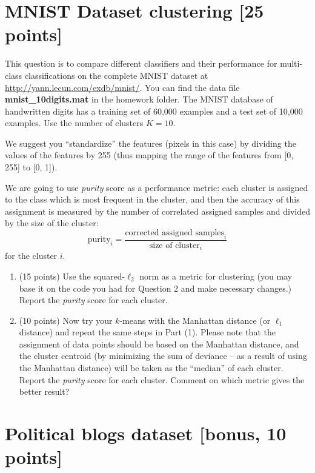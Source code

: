 \documentclass[twoside,10pt]{article}
\begin{document}
\section{MNIST Dataset clustering [25 points]}


This question is to compare different classifiers and their performance for multi-class classifications on the complete MNIST dataset at \url{http://yann.lecun.com/exdb/mnist/}. You can find the data file \textbf{mnist\_10digits.mat} in the homework folder. The MNIST database of handwritten digits has a training set of 60,000 examples and a test set of 10,000 examples. Use the number of clusters $K = 10$.



We suggest you ``standardize'' the features (pixels in this case) by dividing the values of the features by 255 (thus mapping the range of the features from [0, 255] to [0, 1]).

We are going to use  {\it purity} score as a performance metric: each cluster is assigned to the class which is most frequent in the cluster, and then the accuracy of this assignment is measured by the number of correlated assigned samples and divided by the size of the cluster: 
\[
\mbox{purity}_i = \frac{\mbox{corrected assigned samples}_i}{\mbox{size of cluster}_i}
\]
for the cluster $i$. 

\begin{enumerate}

\item (15 points) Use the squared-$\ell_2$ norm as a metric for clustering (you may base it on the code you had for Question 2 and make necessary changes.) 
%
Report the {\it purity} score for each cluster. 

\item (10 points) Now try your $k$-means with the Manhattan distance (or $\ell_1$ distance) and repeat the same steps in Part (1). Please note that the assignment of data points should be based on the Manhattan distance, and the cluster centroid (by minimizing the sum of deviance -- as a result of using the Manhattan distance) will be taken as the ``median'' of each cluster. Report the {\it purity} score for each cluster. Comment on which metric gives the better result?

\end{enumerate}







\section{Political blogs dataset [bonus, 10 points]}
\end{document}
